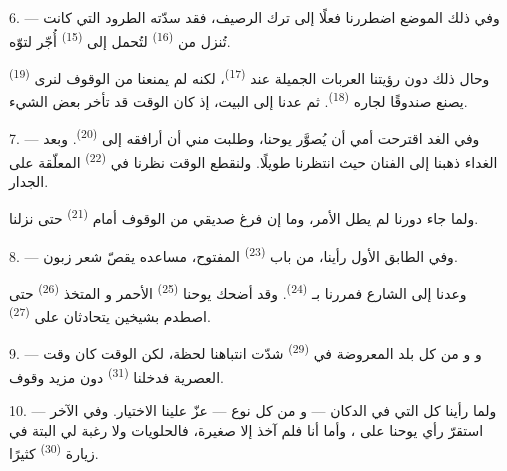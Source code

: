 6. --- وفي ذلك الموضع اضطررنا فعلًا إلى ترك الرصيف، فقد سدّته الطرود
التي كانت تُنزل من  \textsuperscript{(16)} لتُحمل إلى
 \textsuperscript{(15)} أُجّر لتوّه.

وحال ذلك دون رؤيتنا العربات الجميلة عند 
\textsuperscript{(17)}، لكنه لم يمنعنا من الوقوف لنرى 
\textsuperscript{(19)} يصنع صندوقًا لجاره 
\textsuperscript{(18)}. ثم عدنا إلى البيت، إذ كان الوقت قد تأخر بعض الشيء.

\VUsaut{3.0mm}

7. --- وفي الغد اقترحت أمي أن يُصوَّر يوحنا، وطلبت مني أن أرافقه إلى
 \textsuperscript{(20)}. وبعد الغداء ذهبنا إلى 
الفنان حيث انتظرنا طويلًا. ولنقطع الوقت نظرنا في 
\textsuperscript{(22)} المعلّقة على الجدار.

ولما جاء دورنا لم يطل الأمر، وما إن فرغ صديقي من الوقوف أمام
 \textsuperscript{(21)} حتى نزلنا.

8. --- وفي الطابق الأول رأينا، من باب  \textsuperscript{(23)}
المفتوح، مساعده يقصّ شعر زبون.

وعدنا إلى الشارع فمررنا بـ \textsuperscript{(24)}. وقد أضحك
يوحنا  \textsuperscript{(25)} الأحمر و
المتخذ  \textsuperscript{(26)} حتى اصطدم بشيخين يتحادثان على
 \textsuperscript{(27)}.

\VUsaut{3.0mm}

9. --- و و من كل بلد
المعروضة في   \textsuperscript{(29)} شدّت انتباهنا
لحظة، لكن الوقت كان وقت العصرية فدخلنا 
\textsuperscript{(31)} دون مزيد وقوف.

10. --- ولما رأينا كل  التي في الدكان ---  و من كل نوع --- عزّ علينا الاختيار. وفي
الآخر استقرّ رأي يوحنا على ، وأما أنا فلم آخذ إلا
 صغيرة، فالحلويات  ولا رغبة
لي البتة في زيارة  \textsuperscript{(30)} كثيرًا.

\VUsaut{3.0mm}

